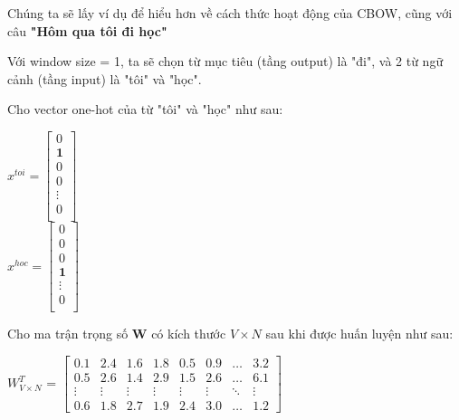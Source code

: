 Chúng ta sẽ lấy ví dụ để hiểu hơn về cách thức hoạt động của CBOW, cũng với câu \textbf{"Hôm qua tôi đi học"}

Với window size = 1, ta sẽ chọn từ mục tiêu (tầng output) là "đi", và 2 từ ngữ cảnh (tầng input) là "tôi" và "học".

Cho vector one-hot của từ "tôi" và "học" như sau:
\begin{center}
    $x^{toi} =
    \begin{bmatrix}
        0\\
        \textbf{1} \\
        0 \\
        0 \\
        \vdots \\
        0 \\
    \end{bmatrix}$ \\
    \vspace{5mm} %
    $x^{hoc} =
    \begin{bmatrix}
        0\\
        0\\
        0\\
        \textbf{1} \\
        \vdots \\
        0 \\
    \end{bmatrix}$
\end{center}

Cho ma trận trọng số \textbf{W} có kích thước $V\times N$ sau khi được huấn luyện như sau:
\begin{center}
    $W^T_{V\times N}$ =
    $\begin{bmatrix}
        0.1 & 2.4 & 1.6 & 1.8 & 0.5 & 0.9 & \dots & 3.2 \\
        0.5 & 2.6 & 1.4 & 2.9 & 1.5 & 2.6 & \dots & 6.1 \\
        \vdots & \vdots & \vdots & \vdots & \vdots & \vdots & \ddots & \vdots \\
        0.6 & 1.8 & 2.7 & 1.9 & 2.4 & 3.0 & \dots & 1.2
    \end{bmatrix}$
\end{center}

